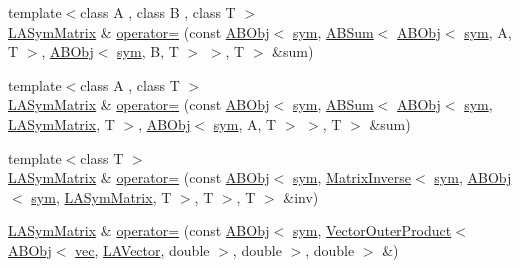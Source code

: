 \begin{DoxyCompactItemize}
\item 
{\footnotesize template$<$class A , class B , class T $>$ }\\\mbox{\hyperlink{classROOT_1_1Minuit2_1_1LASymMatrix}{L\+A\+Sym\+Matrix}} \& \mbox{\hyperlink{classROOT_1_1Minuit2_1_1LASymMatrix_a88d40828624a6418f8b94e239e30d322}{operator=}} (const \mbox{\hyperlink{classROOT_1_1Minuit2_1_1ABObj}{A\+B\+Obj}}$<$ \mbox{\hyperlink{classROOT_1_1Minuit2_1_1sym}{sym}}, \mbox{\hyperlink{classROOT_1_1Minuit2_1_1ABSum}{A\+B\+Sum}}$<$ \mbox{\hyperlink{classROOT_1_1Minuit2_1_1ABObj}{A\+B\+Obj}}$<$ \mbox{\hyperlink{classROOT_1_1Minuit2_1_1sym}{sym}}, A, T $>$, \mbox{\hyperlink{classROOT_1_1Minuit2_1_1ABObj}{A\+B\+Obj}}$<$ \mbox{\hyperlink{classROOT_1_1Minuit2_1_1sym}{sym}}, B, T $>$ $>$, T $>$ \&sum)
\item 
{\footnotesize template$<$class A , class T $>$ }\\\mbox{\hyperlink{classROOT_1_1Minuit2_1_1LASymMatrix}{L\+A\+Sym\+Matrix}} \& \mbox{\hyperlink{classROOT_1_1Minuit2_1_1LASymMatrix_abaf8a2feeb04c66aca17e5876dd7aaff}{operator=}} (const \mbox{\hyperlink{classROOT_1_1Minuit2_1_1ABObj}{A\+B\+Obj}}$<$ \mbox{\hyperlink{classROOT_1_1Minuit2_1_1sym}{sym}}, \mbox{\hyperlink{classROOT_1_1Minuit2_1_1ABSum}{A\+B\+Sum}}$<$ \mbox{\hyperlink{classROOT_1_1Minuit2_1_1ABObj}{A\+B\+Obj}}$<$ \mbox{\hyperlink{classROOT_1_1Minuit2_1_1sym}{sym}}, \mbox{\hyperlink{classROOT_1_1Minuit2_1_1LASymMatrix}{L\+A\+Sym\+Matrix}}, T $>$, \mbox{\hyperlink{classROOT_1_1Minuit2_1_1ABObj}{A\+B\+Obj}}$<$ \mbox{\hyperlink{classROOT_1_1Minuit2_1_1sym}{sym}}, A, T $>$ $>$, T $>$ \&sum)
\item 
{\footnotesize template$<$class T $>$ }\\\mbox{\hyperlink{classROOT_1_1Minuit2_1_1LASymMatrix}{L\+A\+Sym\+Matrix}} \& \mbox{\hyperlink{classROOT_1_1Minuit2_1_1LASymMatrix_a95fd77b55f726095a231817852fceb7d}{operator=}} (const \mbox{\hyperlink{classROOT_1_1Minuit2_1_1ABObj}{A\+B\+Obj}}$<$ \mbox{\hyperlink{classROOT_1_1Minuit2_1_1sym}{sym}}, \mbox{\hyperlink{classROOT_1_1Minuit2_1_1MatrixInverse}{Matrix\+Inverse}}$<$ \mbox{\hyperlink{classROOT_1_1Minuit2_1_1sym}{sym}}, \mbox{\hyperlink{classROOT_1_1Minuit2_1_1ABObj}{A\+B\+Obj}}$<$ \mbox{\hyperlink{classROOT_1_1Minuit2_1_1sym}{sym}}, \mbox{\hyperlink{classROOT_1_1Minuit2_1_1LASymMatrix}{L\+A\+Sym\+Matrix}}, T $>$, T $>$, T $>$ \&inv)
\item 
\mbox{\hyperlink{classROOT_1_1Minuit2_1_1LASymMatrix}{L\+A\+Sym\+Matrix}} \& \mbox{\hyperlink{classROOT_1_1Minuit2_1_1LASymMatrix_a166f84f8396e20c14225ae139ba6af25}{operator=}} (const \mbox{\hyperlink{classROOT_1_1Minuit2_1_1ABObj}{A\+B\+Obj}}$<$ \mbox{\hyperlink{classROOT_1_1Minuit2_1_1sym}{sym}}, \mbox{\hyperlink{classROOT_1_1Minuit2_1_1VectorOuterProduct}{Vector\+Outer\+Product}}$<$ \mbox{\hyperlink{classROOT_1_1Minuit2_1_1ABObj}{A\+B\+Obj}}$<$ \mbox{\hyperlink{classROOT_1_1Minuit2_1_1vec}{vec}}, \mbox{\hyperlink{classROOT_1_1Minuit2_1_1LAVector}{L\+A\+Vector}}, double $>$, double $>$, double $>$ \&)
\end{DoxyCompactItemize}


